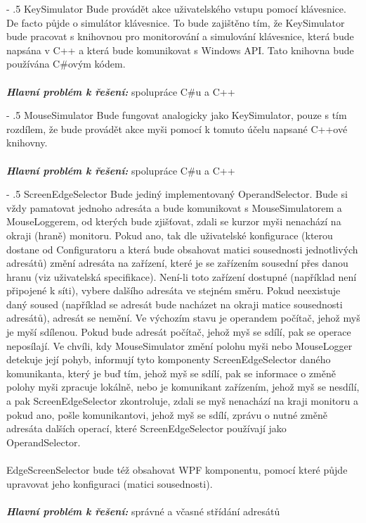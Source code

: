 \documentclass[12pt]{article}
\makeatletter
\newcommand\nodems{MouseSimulator}
\newcommand\nodeks{KeySimulator}
\newcommand\nodeses{ScreenEdgeSelector}
\renewcommand\paragraph{%
    \@startsection{paragraph}{4}{0mm}%
       {-\baselineskip}%
       {.5\baselineskip}%
       {\normalfont\normalsize\bfseries}}
\makeatother
\begin{document}
\paragraph{\nodeks} 
Bude provádět akce uživatelského vstupu pomocí klávesnice. De facto půjde o simulátor klávesnice. To bude zajištěno tím, že KeySimulator bude pracovat s knihovnou pro monitorování a simulování klávesnice, která bude napsána v C++ a která bude komunikovat s Windows API. Tato knihovna bude používána C\#ovým kódem.\\\\
\textbf{\textit{Hlavní problém k řešení:}} spolupráce C\#u a C++

\paragraph{\nodems} 
Bude fungovat analogicky jako KeySimulator, pouze s tím rozdílem, že bude provádět akce myši pomocí k tomuto účelu napsané C++ové knihovny.\\\\
\textbf{\textit{Hlavní problém k řešení:}} spolupráce C\#u a C++

\paragraph{\nodeses}
Bude jediný implementovaný OperandSelector. Bude si vždy pamatovat jednoho adresáta a bude komunikovat s MouseSimulatorem a MouseLoggerem, od kterých bude zjišťovat, zdali se kurzor myši nenachází na okraji (hraně) monitoru. Pokud ano, tak dle uživatelské konfigurace (kterou dostane od Configuratoru a která bude obsahovat matici sousednosti jednotlivých adresátů) změní adresáta na zařízení, které je se zařízením sousední přes danou hranu (viz uživatelská specifikace). Není-li toto zařízení dostupné (například není připojené k síti), vybere dalšího adresáta ve stejném směru. Pokud neexistuje daný soused (například se adresát bude nacházet na okraji matice sousednosti adresátů), adresát se nemění. Ve výchozím stavu je operandem počítač, jehož myš je myší sdílenou. Pokud bude adresát počítač, jehož myš se sdílí, pak se operace neposílají. Ve chvíli, kdy MouseSimulator změní polohu myši nebo MouseLogger detekuje její pohyb, informují tyto komponenty ScreenEdgeSelector daného komunikanta, který je buď tím, jehož myš se sdílí, pak se informace o změně polohy myši zpracuje lokálně, nebo je komunikant zařízením, jehož myš se nesdílí, a pak ScreenEdgeSelector zkontroluje, zdali se myš nenachází na kraji monitoru a pokud ano, pošle komunikantovi, jehož myš se sdílí, zprávu o nutné změně adresáta dalších operací, které ScreenEdgeSelector používají jako OperandSelector.\\\\
EdgeScreenSelector bude též obsahovat WPF komponentu, pomocí které půjde upravovat jeho konfiguraci (matici sousednosti).\\\\
\textbf{\textit{Hlavní problém k řešení:}} správné a včasné střídání adresátů
\end{document}
